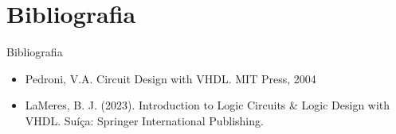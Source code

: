 \documentclass[aspectratio=169]{beamer}
\begin{document}
\section{Bibliografia}
\begin{frame}{Bibliografia}
	\justifying
	
	\begin{itemize}
		\item Pedroni, V.A. Circuit Design with VHDL. MIT Press, 2004
		\item LaMeres, B. J. (2023). Introduction to Logic Circuits \& Logic Design with VHDL. Suíça: Springer International Publishing.

	\end{itemize}
	
\end{frame}


%

\end{document}
